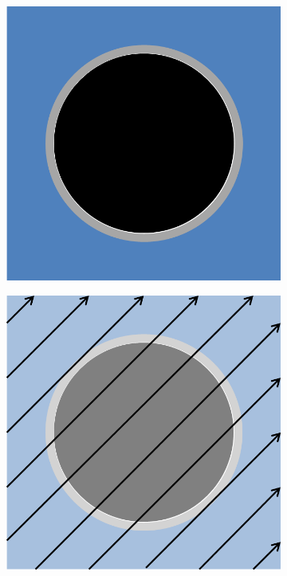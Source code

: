 \begin{figure}[h!]
	\centering
	\begin{subfigure}{0.3\textwidth}
		\centering
		\includegraphics[width=\linewidth]{figures/pin_1.PNG}
		\caption{}
		\label{fig:track-laydown-a}
	\end{subfigure}
	\begin{subfigure}{0.3\textwidth}
		\centering
		\includegraphics[width=\linewidth]{figures/pin_2.PNG}

\end{subfigure}
\end{figure}
